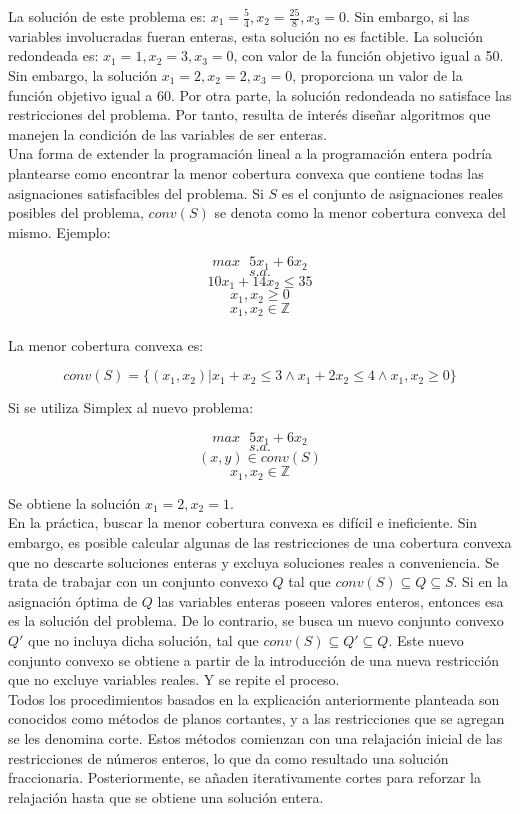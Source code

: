 \documentclass[12pt]{report}
\begin{document}
La solución de este problema es: $x_1 = \frac54,x_2 = \frac{25}{8},x_3 = 0$. Sin embargo, si las variables involucradas fueran enteras, esta solución no es factible. La solución redondeada es: $x_1 = 1,x_2 = 3,x_3 = 0$, con valor de la función objetivo igual a 50. Sin embargo, la solución $x_1 = 2,x_2 = 2,x_3 = 0$, proporciona un valor de la función objetivo igual a 60. Por otra parte, la solución redondeada no satisface las restricciones del problema. Por tanto, resulta de interés diseñar algoritmos que manejen la condición de las variables de ser enteras.\\

Una forma de extender la programación lineal a la programación entera podría plantearse como encontrar la menor cobertura convexa que contiene todas las asignaciones satisfacibles del problema. Si $S$ es el conjunto de asignaciones reales posibles del problema, $conv(S)$ se denota como la menor cobertura convexa del mismo. Ejemplo:

$$max \text{ } 5x_1+6x_2$$
$$s.a.$$
$$10x_1+14x_2 \leq  35$$
$$x_1,x_2\geq 0$$
$$x_1,x_2\in\mathbb{Z}$$\\

La menor cobertura convexa es:

$$conv(S)=\{(x_1,x_2)|x_1+x_2\leq 3 \land x_1+2x_2\leq 4 \land x_1,x_2\geq 0\}$$

Si se utiliza Simplex al nuevo problema:

$$max \text{ } 5x_1+6x_2$$
$$s.a.$$
$$(x,y) \in conv(S)$$
$$x_1,x_2\in\mathbb{Z}$$

Se obtiene la solución $x_1=2, x_2=1$.\\

En la práctica, buscar la menor cobertura convexa es difícil e ineficiente. Sin embargo, es posible calcular algunas de las restricciones de una cobertura convexa que no descarte soluciones enteras y excluya soluciones reales a conveniencia. Se trata de trabajar con un conjunto convexo $Q$ tal que $conv(S)\subseteq Q\subseteq S$. Si en la asignación óptima de $Q$ las variables enteras poseen valores enteros, entonces esa es la solución del problema. De lo contrario, se busca un nuevo conjunto convexo $Q'$ que no incluya dicha solución, tal que $conv(S)\subseteq Q'\subseteq Q$. Este nuevo conjunto convexo se obtiene a partir de la introducción de una nueva restricción que no excluye variables reales. Y se repite el proceso.\\

Todos los procedimientos basados en la explicación anteriormente planteada son conocidos como métodos de planos cortantes, y a las restricciones que se agregan se les denomina corte. Estos métodos comienzan con una relajación inicial de las restricciones de números enteros, lo que da como resultado una solución fraccionaria. Posteriormente, se añaden iterativamente cortes para reforzar la relajación hasta que se obtiene una solución entera.\\
\end{document}

